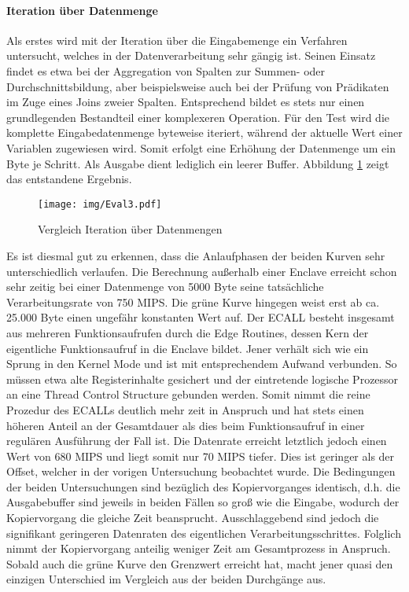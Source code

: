 \paragraph{Iteration über Datenmenge}

Als erstes wird mit der Iteration über die Eingabemenge ein Verfahren untersucht, welches in der Datenverarbeitung sehr gängig ist. Seinen Einsatz findet es etwa bei der Aggregation von Spalten zur Summen- oder Durchschnittsbildung, aber beispielsweise auch bei der Prüfung von Prädikaten im Zuge eines Joins zweier Spalten. Entsprechend bildet es stets nur einen grundlegenden Bestandteil einer komplexeren Operation. Für den Test wird die komplette Eingabedatenmenge byteweise iteriert, während der aktuelle Wert einer Variablen zugewiesen wird. Somit erfolgt eine Erhöhung der Datenmenge um ein Byte je Schritt. Als Ausgabe dient lediglich ein leerer Buffer. Abbildung \ref{fig:eval3} zeigt das entstandene Ergebnis.

\begin{figure}[h]
	\texttt{[image: img/Eval3.pdf]}
	\centering
	\caption{Vergleich Iteration über Datenmengen}
	\label{fig:eval3}
\end{figure}

Es ist diesmal gut zu erkennen, dass die Anlaufphasen der beiden Kurven sehr unterschiedlich verlaufen. Die Berechnung außerhalb einer Enclave erreicht schon sehr zeitig bei einer Datenmenge von 5000 Byte seine tatsächliche Verarbeitungsrate von 750 MIPS. Die grüne Kurve hingegen weist erst ab ca. 25.000 Byte einen ungefähr konstanten Wert auf. Der ECALL besteht insgesamt aus mehreren Funktionsaufrufen durch die Edge Routines, dessen Kern der eigentliche Funktionsaufruf in die Enclave bildet. Jener verhält sich wie ein Sprung in den Kernel Mode und ist mit entsprechendem Aufwand verbunden. So müssen etwa alte Registerinhalte gesichert und der eintretende logische Prozessor an eine Thread Control Structure gebunden werden. Somit nimmt die reine Prozedur des ECALLs deutlich mehr zeit in Anspruch und hat stets einen höheren Anteil an der Gesamtdauer als dies beim Funktionsaufruf in einer regulären Ausführung der Fall ist. Die Datenrate erreicht letztlich jedoch einen Wert von 680 MIPS und liegt somit nur 70 MIPS tiefer. Dies ist geringer als der Offset, welcher in der vorigen Untersuchung beobachtet wurde. Die Bedingungen der beiden Untersuchungen sind bezüglich des Kopiervorganges identisch, d.h. die Ausgabebuffer sind jeweils in beiden Fällen so groß wie die Eingabe, wodurch der Kopiervorgang die gleiche Zeit beansprucht. Ausschlaggebend sind jedoch die signifikant geringeren Datenraten des eigentlichen Verarbeitungsschrittes. Folglich nimmt der Kopiervorgang anteilig weniger Zeit am Gesamtprozess in Anspruch. Sobald auch die grüne Kurve den Grenzwert erreicht hat, macht jener quasi den einzigen Unterschied im Vergleich aus der beiden Durchgänge aus.

